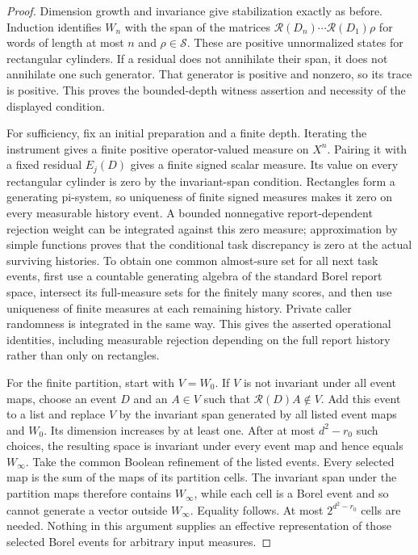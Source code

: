 \begin{proof}
Dimension growth and invariance give stabilization exactly as before. Induction identifies $W_n$ with the span of the matrices
$\mathcal R(D_n)\cdots\mathcal R(D_1)\rho$ for words of length at most $n$ and $\rho\in\mathcal S$. These are positive unnormalized states for rectangular cylinders. If a residual does not annihilate their span, it does not annihilate one such generator. That generator is positive and nonzero, so its trace is positive. This proves the bounded-depth witness assertion and necessity of the displayed condition.

For sufficiency, fix an initial preparation and a finite depth. Iterating the instrument gives a finite positive operator-valued measure on $X^n$. Pairing it with a fixed residual $E_j(D)$ gives a finite signed scalar measure. Its value on every rectangular cylinder is zero by the invariant-span condition. Rectangles form a generating pi-system, so uniqueness of finite signed measures makes it zero on every measurable history event. A bounded nonnegative report-dependent rejection weight can be integrated against this zero measure; approximation by simple functions proves that the conditional task discrepancy is zero at the actual surviving histories. To obtain one common almost-sure set for all next task events, first use a countable generating algebra of the standard Borel report space, intersect its full-measure sets for the finitely many scores, and then use uniqueness of finite measures at each remaining history. Private caller randomness is integrated in the same way. This gives the asserted operational identities, including measurable rejection depending on the full report history rather than only on rectangles.

For the finite partition, start with $V=W_0$. If $V$ is not invariant under all event maps, choose an event $D$ and an $A\in V$ such that $\mathcal R(D)A\notin V$. Add this event to a list and replace $V$ by the invariant span generated by all listed event maps and $W_0$. Its dimension increases by at least one. After at most $d^2-r_0$ such choices, the resulting space is invariant under every event map and hence equals $W_\infty$. Take the common Boolean refinement of the listed events. Every selected map is the sum of the maps of its partition cells. The invariant span under the partition maps therefore contains $W_\infty$, while each cell is a Borel event and so cannot generate a vector outside $W_\infty$. Equality follows. At most $2^{d^2-r_0}$ cells are needed. Nothing in this argument supplies an effective representation of those selected Borel events for arbitrary input measures.
\end{proof}

